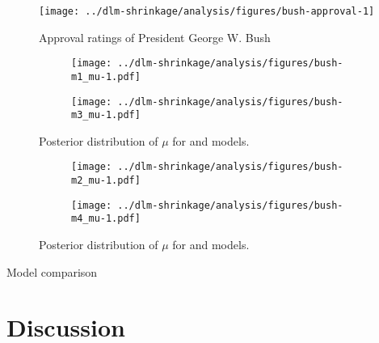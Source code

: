 \begin{figure}[thbp!]
  \centering
  \texttt{[image: ../dlm-shrinkage/analysis/figures/bush-approval-1]}
  \caption{Approval ratings of President George W. Bush}
  \label{dlm:fig:bush_approval}
\end{figure}

\begin{figure}[thbp!]
  \centering
  \begin{subfigure}[b]{\linewidth}
    \texttt{[image: ../dlm-shrinkage/analysis/figures/bush-m1\_mu-1.pdf]}
    \caption{}
  \end{subfigure}

  \begin{subfigure}[b]{\linewidth}
    \texttt{[image: ../dlm-shrinkage/analysis/figures/bush-m3\_mu-1.pdf]}
    \caption{}
  \end{subfigure}
  \caption{Posterior distribution of $\mu$ for  and  models.}
  \label{dlm:fig:bush_mu1}
\end{figure}

\begin{figure}[thbp!]
  \begin{subfigure}[b]{\linewidth}
    \texttt{[image: ../dlm-shrinkage/analysis/figures/bush-m2\_mu-1.pdf]}
    \caption{}
  \end{subfigure}

  \begin{subfigure}[b]{\linewidth}
    \texttt{[image: ../dlm-shrinkage/analysis/figures/bush-m4\_mu-1.pdf]}
    \caption{}
  \end{subfigure}
  \caption{Posterior distribution of $\mu$ for  and  models.}
  \label{dlm:fig:bush_mu2}
\end{figure}


Model comparison

\begin{table}[thbp!]
  \centering
  
  \caption{}
  \label{dlm:tab:bush_model_comp}
\end{table}



\section{Discussion}
\label{dlm:sec:discussion}




